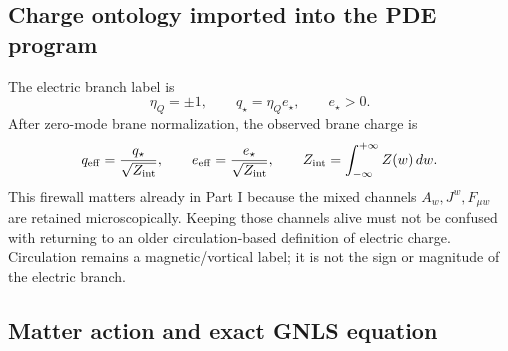 \subsection{Charge ontology imported into the PDE program}
\label{subsec:part01-charge-ontology-import}

The electric branch label is
\begin{equation}
\label{eq:part01-charge-ontology}
\eta_Q=\pm1,
\qquad
q_\star=\eta_Q e_\star,
\qquad
e_\star>0.
\end{equation}
After zero-mode brane normalization, the observed brane charge is
\begin{equation}
\label{eq:part01-effective-charge}
q_{\rm eff}=\frac{q_\star}{\sqrt{Z_{\rm int}}},
\qquad
e_{\rm eff}=\frac{e_\star}{\sqrt{Z_{\rm int}}},
\qquad
Z_{\rm int}=\int_{-\infty}^{+\infty}Z(w)\,dw.
\end{equation}
This firewall matters already in Part I because the mixed channels \(A_w,J^w,F_{\mu w}\) are retained microscopically.  Keeping those channels alive must not be confused with returning to an older circulation-based definition of electric charge.  Circulation remains a magnetic/vortical label; it is not the sign or magnitude of the electric branch.

\subsection{Matter action and exact GNLS equation}
\label{subsec:part01-matter-action}

